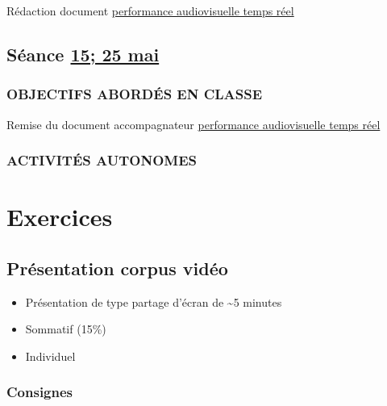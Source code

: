 \documentclass[
]{book}
\providecommand{\tightlist}{%
  \setlength{\itemsep}{0pt}\setlength{\parskip}{0pt}}
\begin{document}
Rédaction document \protect\hyperlink{sommatif_5}{performance audiovisuelle temps réel}

\hypertarget{semaine_18}{%
\section{\texorpdfstring{Séance \protect\hyperlink{semaine_18}{15; 25 mai}}{Séance 15; 25 mai}}\label{semaine_18}}

\hypertarget{objectifs-aborduxe9s-en-classe-17}{%
\subsection{OBJECTIFS ABORDÉS EN CLASSE}\label{objectifs-aborduxe9s-en-classe-17}}

Remise du document accompagnateur \protect\hyperlink{sommatif_5}{performance audiovisuelle temps réel}

\hypertarget{activituxe9s-autonomes-17}{%
\subsection{ACTIVITÉS AUTONOMES}\label{activituxe9s-autonomes-17}}

\hypertarget{exercices}{%
\chapter{Exercices}\label{exercices}}

\hypertarget{sommatif_1}{%
\section{Présentation corpus vidéo}\label{sommatif_1}}

\begin{itemize}
\tightlist
\item
  Présentation de type partage d'écran de \textasciitilde5 minutes
\item
  Sommatif (15\%)
\item
  Individuel
\end{itemize}

\hypertarget{consignes}{%
\subsection{Consignes}\label{consignes}}
\end{document}
